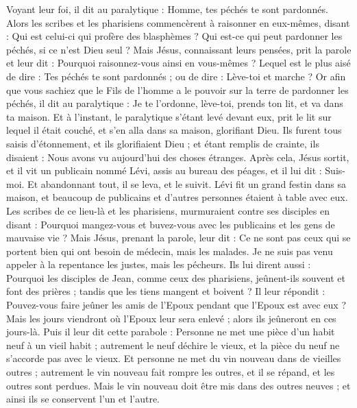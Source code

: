 \begin{multicols}{2}
Voyant leur foi, il dit au paralytique : Homme, tes péchés te sont pardonnés.
Alors les scribes et les pharisiens commencèrent à raisonner en eux-mêmes, disant : Qui est celui-ci qui profère des blasphèmes ? Qui est-ce qui peut pardonner les péchés, si ce n’est Dieu seul ?
Mais Jésus, connaissant leurs pensées, prit la parole et leur dit : Pourquoi raisonnez-vous ainsi en vous-mêmes ?
Lequel est le plus aisé de dire : Tes péchés te sont pardonnés ; ou de dire : Lève-toi et marche ?
Or afin que vous sachiez que le Fils de l'homme a le pouvoir sur la terre de pardonner les péchés, il dit au paralytique : Je te l’ordonne, lève-toi, prends ton lit, et va dans ta maison.
Et à l'instant, le paralytique s'étant levé devant eux, prit le lit sur lequel il était couché, et s'en alla dans sa maison, glorifiant Dieu.
Ils furent tous saisis d'étonnement, et ils glorifiaient Dieu ; et étant remplis de crainte, ils disaient : Nous avons vu aujourd’hui des choses étranges.
Après cela, Jésus sortit, et il vit un publicain nommé Lévi, assis au bureau des péages, et il lui dit : Suis-moi.
Et abandonnant tout, il se leva, et le suivit.
Lévi fit un grand festin dans sa maison, et beaucoup de publicains et d’autres personnes étaient à table avec eux.
Les scribes de ce lieu-là et les pharisiens, murmuraient contre ses disciples en disant : Pourquoi mangez-vous et buvez-vous avec les publicains et les gens de mauvaise vie ?
Mais Jésus, prenant la parole, leur dit : Ce ne sont pas ceux qui se portent bien qui ont besoin de médecin, mais les malades.
Je ne suis pas venu appeler à la repentance les justes, mais les pécheurs.
Ils lui dirent aussi : Pourquoi les disciples de Jean, comme ceux des pharisiens, jeûnent-ils souvent et font des prières ; tandis que les tiens mangent et boivent ?
Il leur répondit : Pouvez-vous faire jeûner les amis de l'Epoux pendant que l'Epoux est avec eux ?
Mais les jours viendront où l'Epoux leur sera enlevé ; alors ils jeûneront en ces jours-là.
Puis il leur dit cette parabole : Personne ne met une pièce d'un habit neuf à un vieil habit ; autrement le neuf déchire le vieux, et la pièce du neuf ne s’accorde pas avec le vieux.
Et personne ne met du vin nouveau dans de vieilles outres ; autrement le vin nouveau fait rompre les outres, et il se répand, et les outres sont perdues.
Mais le vin nouveau doit être mis dans des outres neuves ; et ainsi ils se conservent l'un et l'autre.

\end{multicols}
